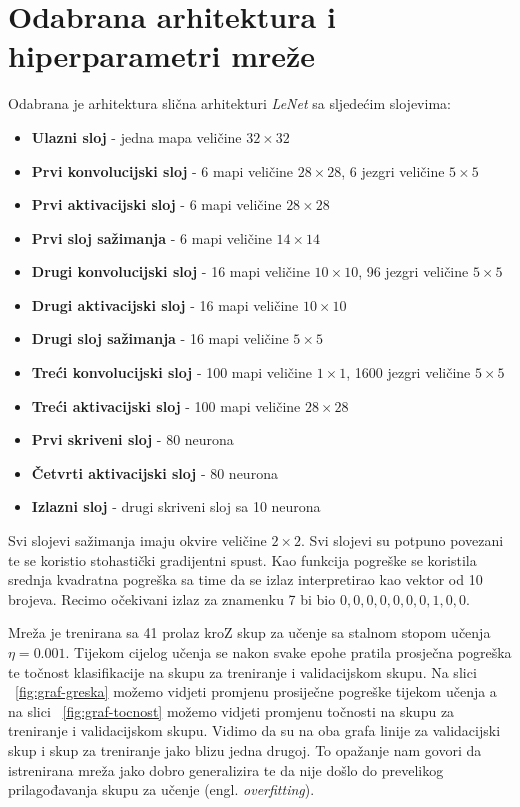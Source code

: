 \documentclass[times, utf8, zavrsni, numeric]{fer}
\begin{document}
\section{Odabrana arhitektura i hiperparametri mreže}
Odabrana je arhitektura slična arhitekturi \textit{LeNet} \citep{lecun1995convolutional} sa sljedećim slojevima:
\begin{itemize}
\item \textbf{Ulazni sloj} - jedna mapa veličine $32 \times 32$
\item \textbf{Prvi konvolucijski sloj} - 6 mapi veličine $28 \times 28$, 6 jezgri veličine $5 \times 5$
\item \textbf{Prvi aktivacijski sloj} - 6 mapi veličine $28 \times 28$
\item \textbf{Prvi sloj sažimanja} - 6 mapi veličine $14 \times 14$
\item \textbf{Drugi konvolucijski sloj} - 16 mapi veličine $10 \times 10$, 96 jezgri veličine $5 \times 5$
\item \textbf{Drugi aktivacijski sloj} - 16 mapi veličine $10 \times 10$
\item \textbf{Drugi sloj sažimanja} - 16 mapi veličine $5 \times 5$
\item \textbf{Treći konvolucijski sloj} - 100 mapi veličine $1 \times 1$, 1600 jezgri veličine $5 \times 5$
\item \textbf{Treći aktivacijski sloj} - 100 mapi veličine $28 \times 28$
\item \textbf{Prvi skriveni sloj} - 80 neurona
\item \textbf{Četvrti aktivacijski sloj} - 80 neurona
\item \textbf{Izlazni sloj} - drugi skriveni sloj sa 10 neurona
\end{itemize}

Svi slojevi sažimanja imaju okvire veličine $2 \times 2$. Svi slojevi su potpuno povezani te se koristio stohastički gradijentni spust. Kao funkcija pogreške se koristila srednja kvadratna pogreška sa time da se izlaz interpretirao kao vektor od 10 brojeva. Recimo očekivani izlaz za znamenku 7 bi bio ${0,0,0,0,0,0,0,1,0,0}$.

Mreža je trenirana sa 41 prolaz kroZ skup za učenje sa stalnom stopom učenja $\eta=0.001$. Tijekom cijelog učenja se nakon svake epohe pratila prosječna pogreška te točnost klasifikacije na skupu za treniranje i validacijskom skupu. Na slici ~\ref{fig:graf-greska} možemo vidjeti promjenu prosiječne pogreške tijekom učenja a na slici ~\ref{fig:graf-tocnost} možemo vidjeti promjenu točnosti na skupu za treniranje i validacijskom skupu. Vidimo da su na oba grafa linije za validacijski skup i skup za treniranje jako blizu jedna drugoj. To opažanje nam govori da istrenirana mreža jako dobro generalizira te da nije došlo do prevelikog prilagođavanja skupu za učenje (engl. \textit{overfitting}).
\end{document}
